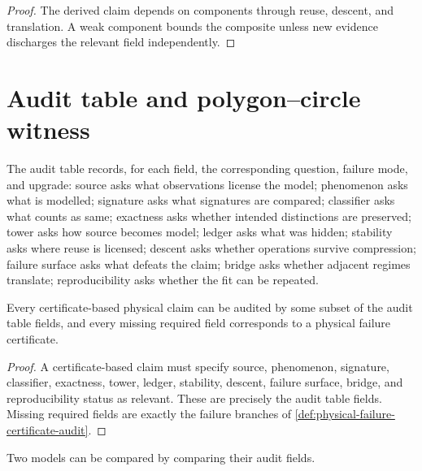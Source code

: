 \begin{proof}
The derived claim depends on components through reuse, descent, and translation. A weak component bounds the composite unless new evidence discharges the relevant field independently.
\end{proof}

\section{Audit table and polygon--circle witness}
\label{sec:audit-table-polygon-circle}

\begin{definition}
\label{def:audit-table}
The audit table records, for each field, the corresponding question, failure mode, and upgrade: source asks what observations license the model; phenomenon asks what is modelled; signature asks what signatures are compared; classifier asks what counts as same; exactness asks whether intended distinctions are preserved; tower asks how source becomes model; ledger asks what was hidden; stability asks where reuse is licensed; descent asks whether operations survive compression; failure surface asks what defeats the claim; bridge asks whether adjacent regimes translate; reproducibility asks whether the fit can be repeated.
\end{definition}

\begin{theorem}
\label{thm:audit-table-covers-certificate-claims}
Every certificate-based physical claim can be audited by some subset of the audit table fields, and every missing required field corresponds to a physical failure certificate.
\end{theorem}

\begin{proof}
A certificate-based claim must specify source, phenomenon, signature, classifier, exactness, tower, ledger, stability, descent, failure surface, bridge, and reproducibility status as relevant. These are precisely the audit table fields. Missing required fields are exactly the failure branches of \autoref{def:physical-failure-certificate-audit}.
\end{proof}

\begin{corollary}
\label{cor:audit-tables-comparison-explicit}
Two models can be compared by comparing their audit fields.
\end{corollary}

